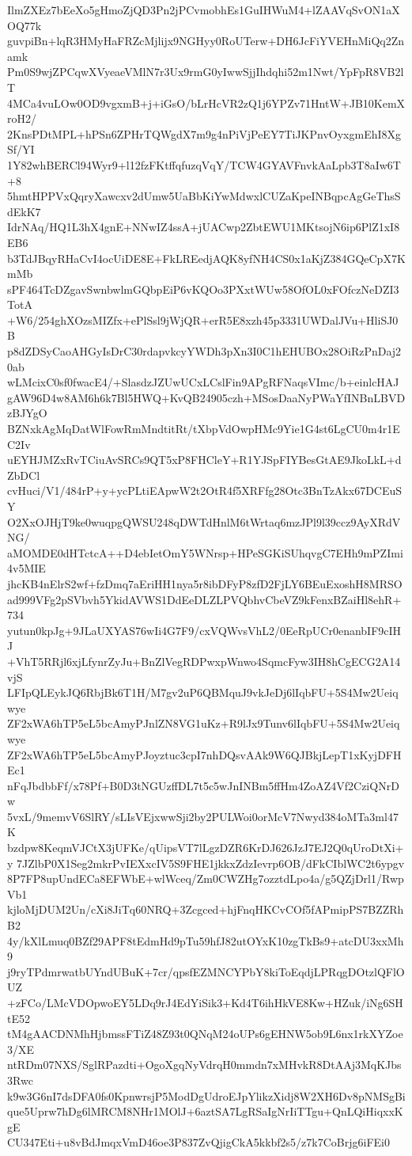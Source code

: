 IlmZXEz7bEeXo5gHmoZjQD3Pn2jPCvmobhEs1GuIHWuM4+lZAAVqSvON1aXOQ77k
guvpiBn+lqR3HMyHaFRZcMjlijx9NGHyy0RoUTerw+DH6JcFiYVEHnMiQq2Znamk
Pm0S9wjZPCqwXVyeaeVMlN7r3Ux9rmG0yIwwSjjIhdqhi52m1Nwt/YpFpR8VB2lT
4MCa4vuLOw0OD9vgxmB+j+iGsO/bLrHcVR2zQ1j6YPZv71HntW+JB10KemXroH2/
2KnsPDtMPL+hPSn6ZPHrTQWgdX7m9g4nPiVjPeEY7TiJKPnvOyxgmEhI8XgSf/YI
1Y82whBERCl94Wyr9+l12fzFKtffqfuzqVqY/TCW4GYAVFnvkAaLpb3T8aIw6T+8
5hmtHPPVxQqryXawcxv2dUmw5UaBbKiYwMdwxlCUZaKpeINBqpcAgGeThsSdEkK7
IdrNAq/HQ1L3hX4gnE+NNwIZ4ssA+jUACwp2ZbtEWU1MKtsojN6ip6PlZ1xI8EB6
b3TdJBqyRHaCvI4ocUiDE8E+FkLREedjAQK8yfNH4CS0x1aKjZ384GQeCpX7KmMb
sPF464TcDZgavSwnbwlmGQbpEiP6vKQOo3PXxtWUw58OfOL0xFOfczNeDZI3TotA
+W6/254ghXOzsMIZfx+ePlSsl9jWjQR+erR5E8xzh45p3331UWDalJVu+HliSJ0B
p8dZDSyCaoAHGyIsDrC30rdapvkcyYWDh3pXn3I0C1hEHUBOx28OiRzPnDaj20ab
wLMcixC0sf0fwacE4/+SlasdzJZUwUCxLCslFin9APgRFNaqsVImc/b+einlcHAJ
gAW96D4w8AM6h6k7Bl5HWQ+KvQB24905czh+MSosDaaNyPWaYfINBnLBVDzBJYgO
BZNxkAgMqDatWlFowRmMndtitRt/tXbpVdOwpHMc9Yie1G4st6LgCU0m4r1EC2Iv
uEYHJMZxRvTCiuAvSRCs9QT5xP8FHCleY+R1YJSpFIYBesGtAE9JkoLkL+dZbDCl
cvHuci/V1/484rP+y+ycPLtiEApwW2t2OtR4f5XRFfg28Otc3BnTzAkx67DCEuSY
O2XxOJHjT9ke0wuqpgQWSU248qDWTdHnlM6tWrtaq6mzJPl9l39ccz9AyXRdVNG/
aMOMDE0dHTctcA++D4ebIetOmY5WNrsp+HPeSGKiSUhqvgC7EHh9mPZImi4v5MIE
jhcKB4nElrS2wf+fzDmq7aEriHH1nya5r8ibDFyP8zfD2FjLY6BEuExoshH8MRSO
ad999VFg2pSVbvh5YkidAVWS1DdEeDLZLPVQbhvCbeVZ9kFenxBZaiHl8ehR+734
yutun0kpJg+9JLaUXYAS76wIi4G7F9/cxVQWvsVhL2/0EeRpUCr0enanbIF9cIHJ
+VhT5RRjl6xjLfynrZyJu+BnZlVegRDPwxpWnwo4SqmcFyw3IH8hCgECG2A14vjS
LFIpQLEykJQ6RbjBk6T1H/M7gv2uP6QBMquJ9vkJeDj6lIqbFU+5S4Mw2Ueiqwye
ZF2xWA6hTP5eL5bcAmyPJnlZN8VG1uKz+R9lJx9Tunv6lIqbFU+5S4Mw2Ueiqwye
ZF2xWA6hTP5eL5bcAmyPJoyztuc3cpI7nhDQsvAAk9W6QJBkjLepT1xKyjDFHEc1
nFqJbdbbFf/x78Pf+B0D3tNGUzffDL7t5c5wJnINBm5ffHm4ZoAZ4Vf2CziQNrDw
5vxL/9memvV6SlRY/sLIsVEjxwwSji2by2PULWoi0orMcV7Nwyd384oMTa3ml47K
bzdpw8KeqmVJCtX3jUFKe/qUipsVT7lLgzDZR6KrDJ626JzJ7EJ2Q0qUroDtXi+y
7JZlbP0X1Seg2mkrPvIEXxcIV5S9FHE1jkkxZdzIevrp6OB/dFkCIblWC2t6ypgv
8P7FP8upUndECa8EFWbE+wlWceq/Zm0CWZHg7ozztdLpo4a/g5QZjDrl1/RwpVb1
kjloMjDUM2Un/cXi8JiTq60NRQ+3Zcgced+hjFnqHKCvCOf5fAPmipPS7BZZRhB2
4y/kXlLmuq0BZf29APF8tEdmHd9pTu59hfJ82utOYxK10zgTkBs9+atcDU3xxMh9
j9ryTPdmrwatbUYndUBuK+7cr/qpsfEZMNCYPbY8kiToEqdjLPRqgDOtzlQFlOUZ
+zFCo/LMcVDOpwoEY5LDq9rJ4EdYiSik3+Kd4T6ihHkVE8Kw+HZuk/iNg6SHtE52
tM4gAACDNMhHjbmssFTiZ48Z93t0QNqM24oUPs6gEHNW5ob9L6nx1rkXYZoe3/XE
ntRDm07NXS/SglRPazdti+OgoXgqNyVdrqH0mmdn7xMHvkR8DtAAj3MqKJbs3Rwc
k9w3G6nI7dsDFA0fs0KpnwrsjP5ModDgUdroEJpYlikzXidj8W2XH6Dv8pNMSgBi
que5Uprw7hDg6lMRCM8NHr1MOlJ+6aztSA7LgRSaIgNrIiTTgu+QnLQiHiqxxKgE
CU347Eti+u8vBdJmqxVmD46oe3P837ZvQjigCkA5kkbf2s5/z7k7CoBrjg6iFEi0
